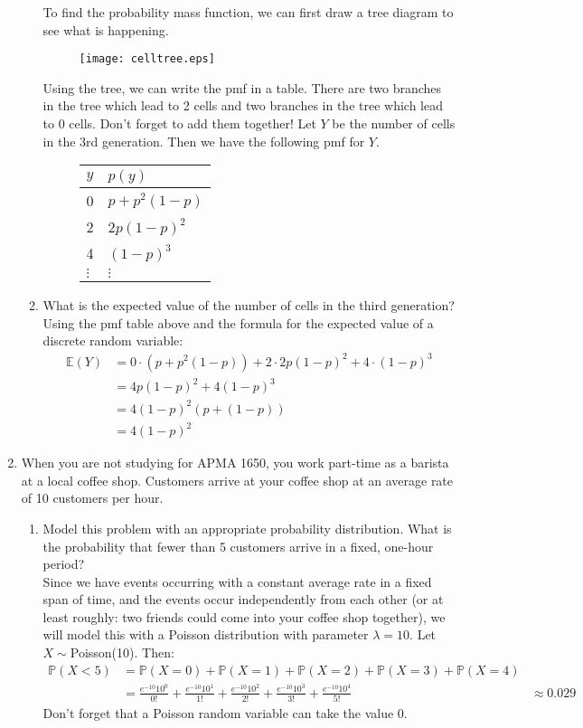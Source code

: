 \documentclass[12pt]{article}
\def\P{{\mathbb P}}
\def\E{{\mathbb E}}
\begin{document}
\begin{enumerate}
\begin{enumerate}
To find the probability mass function, we can first draw a tree diagram to see what is happening.
\begin{figure}[H]
\centering
\texttt{[image: celltree.eps]}
\end{figure}
Using the tree, we can write the pmf in a table. There are two branches in the tree which lead to 2 cells and two branches in the tree which lead to 0 cells. Don't forget to add them together! Let $Y$ be the number of cells in the 3rd generation. Then we have the following pmf for $Y$.
\begin{figure}[H]
\centering
\begin{tabular}{l@{\hskip 2cm}l}
\toprule
$y$ & $p(y)$\\
\midrule
0 & $p + p^2(1-p)$\\
2 & $2p(1-p)^2$ \\
4 & $(1-p)^3$\\
$\vdots$ & $\vdots$\\
\bottomrule
\end{tabular}
\end{figure}

\item What is the expected value of the number of cells in the third generation?\\

Using the pmf table above and the formula for the expected value of a discrete random variable:
\begin{align*}
\E(Y) &= 0 \cdot (p + p^2(1-p)) + 2 \cdot 2p(1-p)^2 + 4 \cdot(1-p)^3 \\
&= 4 p(1-p)^2 + 4 (1-p)^3 \\
&= 4(1-p)^2(p + (1-p)) \\
&= 4(1-p)^2
\end{align*}
\end{enumerate}

\item When you are not studying for APMA 1650, you work part-time as a barista at a local coffee shop. Customers arrive at your coffee shop at an average rate of 10 customers per hour.
\begin{enumerate}
\item Model this problem with an appropriate probability distribution. What is the probability that fewer than 5 customers arrive in a fixed, one-hour period?\\

Since we have events occurring with a constant average rate in a fixed span of time, and the events occur independently from each other (or at least roughly: two friends could come into your coffee shop together), we will model this with a Poisson distribution with parameter $\lambda = 10$. Let $X \sim$Poisson(10). Then:
\begin{align*}
\P(X < 5) &= \P(X = 0) + \P(X = 1) + \P(X = 2) + \P(X = 3) + \P(X = 4)\\
&= \frac{e^{-10} 10^0}{0!} + \frac{e^{-10} 10^1}{1!} + \frac{e^{-10} 10^2}{2!} + \frac{e^{-10} 10^3}{3!} + \frac{e^{-10} 10^4}{5!}&\approx 0.029
\end{align*} 
Don't forget that a Poisson random variable can take the value 0.


\end{enumerate}
\end{enumerate}
\end{document}
